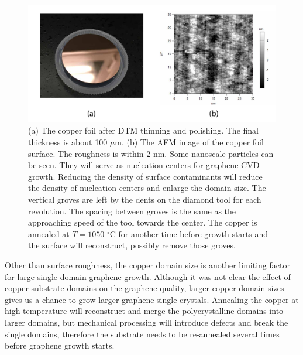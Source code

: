 \documentclass[pdflatex, sectionletters, 12pt]{pittetd}    %
\begin{document}
\begin{figure}[h!]
	\centering
	\includegraphics[width=1.0\textwidth]{Drawing/DTMCopper.pdf}
	\caption{(a) The copper foil after DTM thinning and polishing. The final thickness is about 100 $\mu$m. (b) The AFM image of the copper foil surface. The roughness is within 2 nm. Some nanoscale particles can be seen. They will serve as nucleation centers for graphene CVD growth. Reducing the density of surface contaminants will reduce the density of nucleation centers and enlarge the domain size. The vertical groves are left by the dents on the diamond tool for each revolution. The spacing between groves is the same as the approaching speed of the tool towards the center. The copper is annealed at $T = 1050$ $^{\circ}$C for another time before growth starts and the surface will reconstruct, possibly remove those groves.}
	\label{FIG:DTMFinishing}
\end{figure}

Other than surface roughness, the copper domain size is another limiting factor for large single domain graphene growth. Although it was not clear the effect of copper substrate domains on the graphene quality\cite{kim2012direct, wang2012controllable, wofford2010graphene}, larger copper domain sizes gives us a chance to grow larger graphene single crystals. Annealing the copper at high temperature will reconstruct and merge the polycrystalline domains into larger domains, but mechanical processing will introduce defects and break the single domains, therefore the substrate needs to be re-annealed several times before graphene growth starts.
\end{document}
